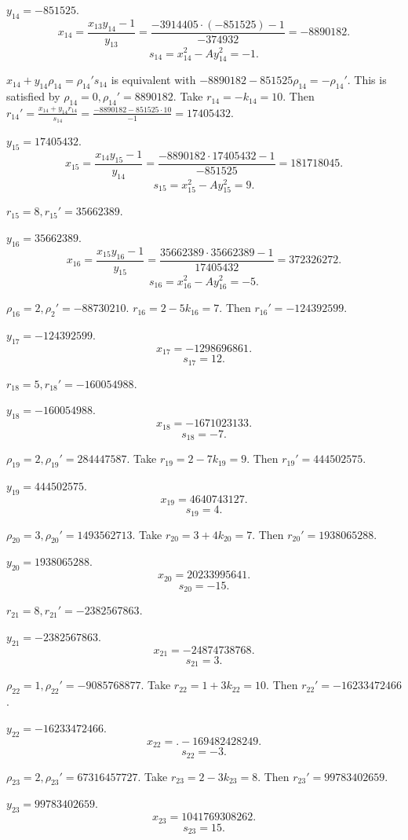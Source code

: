 \documentclass{article}
\theoremstyle{definition}
\begin{document}
$y_{14}=-851525$.
\[
x_{14} = \frac{x_{13}y_{14}-1}{y_{13}} = \frac{-3914405 \cdot (-851525)-1}{-374932} = -8890182.
\]
\[
s_{14} = x_{14}^2 - Ay_{14}^2 =  -1.
\]

$x_{14}+y_{14} \rho_{14} =\rho_{14}'s_{14}$ is equivalent with
$-8890182-851525\rho_{14}= - \rho_{14}'$. This is satisfied by
$\rho_{14}=0, \rho_{14}'=8890182$.
Take $r_{14}=-k_{14} = 10$.
Then $r_{14}'= \frac{x_{14}+y_{14}r_{14}}{s_{14}}
=\frac{-8890182 -851525 \cdot 10}{-1}=17405432$.

$y_{15}=17405432$.
\[
x_{15} = \frac{x_{14}y_{15}-1}{y_{14}} =\frac{-8890182 \cdot 17405432-1}{-851525} = 181718045.
\]
\[
s_{15} = x_{15}^2 - Ay_{15}^2 =  9.
\]

$r_{15}=8, r_{15}'=35662389$.

$y_{16}=35662389$.
\[
x_{16} = \frac{x_{15}y_{16}-1}{y_{15}} =\frac{35662389 \cdot 35662389-1}{17405432} = 372326272.
\]
\[
s_{16} = x_{16}^2 - Ay_{16}^2 =  -5.
\]

$\rho_{16}=2, \rho_2'=-88730210$. 
$r_{16}=2-5k_{16} = 7$. Then $r_{16}'=-124392599$.

$y_{17}=-124392599$.
\[
x_{17} = -1298696861.
\]
\[
s_{17} = 12.
\]

$r_{18}=5, r_{18}'=-160054988$.

$y_{18}=-160054988$.
\[
x_{18} = -1671023133.
\]
\[
s_{18} = -7.
\]

$\rho_{19}=2, \rho_{19}'=284447587$. 
Take $r_{19}=2-7k_{19} = 9$.
Then $r_{19}'=444502575$.

$y_{19}=444502575$.
\[
x_{19} = 4640743127.
\]
\[
s_{19} = 4.
\]

$\rho_{20}=3, \rho_{20}'=1493562713$. Take
$r_{20} = 3+4k_{20} = 7$. Then
$r_{20}' = 1938065288$.


$y_{20}=1938065288$.
\[
x_{20} = 20233995641.
\]
\[
s_{20} = -15.
\]

$r_{21}=8, r_{21}'=-2382567863$. 

$y_{21}=-2382567863$.
\[
x_{21} = -24874738768.
\]
\[
s_{21} = 3.
\]

$\rho_{22}=1, \rho_{22}'=-9085768877$.
Take $r_{22}=1+3k_{22} = 10$.  Then
$r_{22}'=-16233472466$.

$y_{22}=-16233472466$.
\[
x_{22} = .-169482428249.
\]
\[
s_{22} = -3.
\]

$\rho_{23}=2, \rho_{23}'=67316457727$.
Take $r_{23}=2-3k_{23}=8$. Then
$r_{23}'=99783402659$.

$y_{23}=99783402659$.
\[
x_{23} = 1041769308262.
\]
\[
s_{23} = 15.
\]
\end{document}
